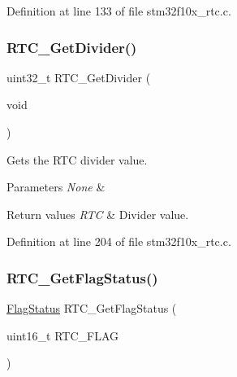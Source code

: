Definition at line 133 of file stm32f10x\+\_\+rtc.\+c.

\mbox{\label{group___r_t_c___private___functions_gaa4f00e0469fedcf6cbf23760e6d801ed}} 
\subsubsection{\texorpdfstring{R\+T\+C\+\_\+\+Get\+Divider()}{RTC\_GetDivider()}}
{\footnotesize\ttfamily uint32\+\_\+t R\+T\+C\+\_\+\+Get\+Divider (\begin{DoxyParamCaption}\item[{void}]{ }\end{DoxyParamCaption})}



Gets the R\+TC divider value. 


\begin{DoxyParams}{Parameters}
{\em None} & \\
\hline
\end{DoxyParams}

\begin{DoxyRetVals}{Return values}
{\em R\+TC} & Divider value. \\
\hline
\end{DoxyRetVals}


Definition at line 204 of file stm32f10x\+\_\+rtc.\+c.

\mbox{\label{group___r_t_c___private___functions_ga21a85e5f846cb4552d5e76420779f3f6}} 
\subsubsection{\texorpdfstring{R\+T\+C\+\_\+\+Get\+Flag\+Status()}{RTC\_GetFlagStatus()}}
{\footnotesize\ttfamily \hyperlink{group___exported__types_ga89136caac2e14c55151f527ac02daaff}{Flag\+Status} R\+T\+C\+\_\+\+Get\+Flag\+Status (\begin{DoxyParamCaption}\item[{uint16\+\_\+t}]{R\+T\+C\+\_\+\+F\+L\+AG }\end{DoxyParamCaption})}



